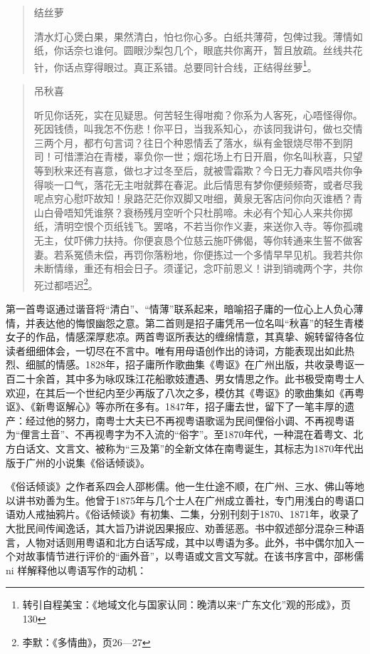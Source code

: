 \begin{quote}
结丝萝

清水灯心煲白果，果然清白，怕乜你心多。白纸共薄荷，包俾过我。薄情如纸，你话奈乜谁何。圆眼沙梨包几个，眼底共你离开，暂且放疏。丝线共花针，你话点穿得眼过。真正系错。总要同针合线，正结得丝萝\footnote{转引自程美宝：《地域文化与国家认同：晚清以来“广东文化”观的形成》，页130}。
\end{quote}

\begin{quote}
吊秋喜

听见你话死，实在见疑思。何苦轻生得咁痴？你系为人客死，心唔怪得你。死因钱债，叫我怎不伤悲！你平日，当我系知心，亦该同我讲句，做乜交情三两个月，都冇句言词？往日个种恩情丢了落水，纵有金银烧尽带不到阴司！可惜漂泊在青楼，辜负你一世；烟花场上冇日开眉，你名叫秋喜，只望等到秋来还有喜意，做乜才过冬至后，就被雪霜欺？今日无力春风唔共你争得啖一口气，落花无主咁就葬在春泥。此后情思有梦你便频频寄，或者尽我呢点穷心慰吓故知！泉路茫茫你双脚又咁细，黄泉无客店问你向灭谁栖？青山白骨唔知凭谁祭？衰杨残月空听个只杜鹃啼。未必有个知心人来共你掷纸，清明空恨个页纸钱飞。罢咯，不若当你作义妻，来送你入寺。等你孤魂无主，仗吓佛力扶持。你便哀恳个位慈云施吓佛偈，等你转通来生誓不做客妻。若系冤债未偿，再罚你落粉地，你便拣过一个多情早早见机。我若共你未断情缘，重还有相会日子。须谨记，念吓前恩义！讲到销魂两个字，共你死过都唔迟\footnote{李默：《多情曲》，页26—27}。
\end{quote}

第一首粤讴通过谐音将“清白”、“情薄”联系起来，暗喻招子庸的一位心上人负心薄情，并表达他的悔恨幽怨之意。第二首则是招子庸凭吊一位名叫“秋喜”的轻生青楼女子的作品，情感深厚悲凉。两首粤讴所表达的缠绵情意，其真挚、婉转留待各位读者细细体会，一切尽在不言中。唯有用母语创作出的诗词，方能表现出如此热烈、细腻的情感。1828年，招子庸所作歌曲集《粤讴》在广州出版，共收录粤讴一百二十余首，其中多为咏叹珠江花船歌妓遭遇、男女情思之作。此书极受南粤士人欢迎，在其后一个世纪内至少再版了八次之多，模仿其《粤讴》的歌曲集如《再粤讴》、《新粤讴解心》等亦所在多有。1847年，招子庸去世，留下了一笔丰厚的遗产：经过他的努力，南粤士大夫已不再视粤语歌谣为民间俚俗小调、不再视粤语为“俚言土音”、不再视粤字为不入流的“俗字”。至1870年代，一种混在着粤文、北方白话文、文言文、被称为“三及第”的全新文体在南粤诞生，其标志为1870年代出版于广州的小说集《俗话倾谈》。

《俗话倾谈》之作者系四会人邵彬儒。他一生仕途不顺，在广州、三水、佛山等地以讲书劝善为生。他曾于1875年与几个士人在广州成立善社，专门用浅白的粤语口语劝人戒抽鸦片。《俗话倾谈》有初集、二集，分别刊刻于1870、1871年，收录了大批民间传闻逸话，其大旨乃讲说因果报应、劝善惩恶。书中叙述部分混杂三种语言，人物对话则用粤语和北方白话写成，其中以粤语为多。此外，书中偶尔加入一个对故事情节进行评价的“画外音”，以粤语或文言文写就。在该书序言中，邵彬儒ni 样解释他以粤语写作的动机：

